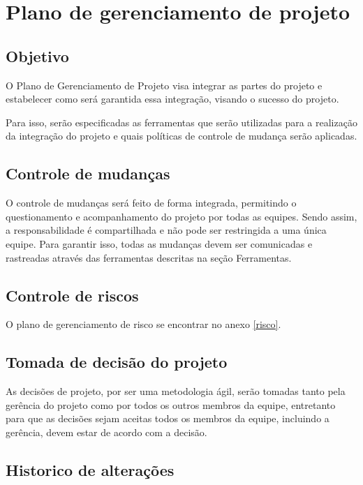 \section{Plano de gerenciamento de projeto}

\subsection{Objetivo}

  O Plano de Gerenciamento de Projeto visa integrar as partes do projeto e estabelecer como será garantida essa integração, visando o
  sucesso do projeto.

  Para isso, serão especificadas as ferramentas que serão utilizadas para a realização da integração do projeto e quais políticas de
  controle de mudança serão aplicadas.

\subsection{Controle de mudanças}

  O controle de mudanças será feito de forma integrada, permitindo o questionamento e acompanhamento do projeto por todas as equipes.
  Sendo assim, a responsabilidade é compartilhada e não pode ser restringida a uma única equipe. Para garantir isso, todas as mudanças
  devem ser comunicadas e rastreadas através das ferramentas descritas na seção Ferramentas.

\subsection{Controle de riscos}

  O plano de gerenciamento de risco se encontrar no anexo \ref{risco}.

\subsection{Tomada de decisão do projeto}

  As decisões de projeto, por ser uma metodologia ágil, serão tomadas tanto pela gerência do projeto como por todos os outros membros da
  equipe, entretanto para que as decisões sejam aceitas todos os membros da equipe, incluindo a gerência, devem estar de acordo com a
  decisão.

\subsection{Historico de alterações}

